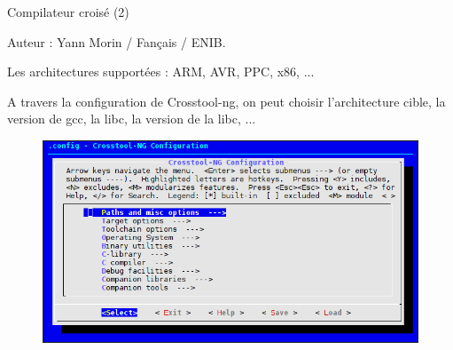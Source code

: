 \documentclass[12pt, t]{beamer}
\begin{document}
\begin{frame}{Compilateur croisé (2)}

    \vspace{10pt}
    Auteur : Yann Morin / Fançais / ENIB.

    {
        \vspace{10pt}
        Les architectures supportées : ARM, AVR, PPC, x86, ...
    }

    {
        \vspace{10pt}
        A travers la configuration de Crosstool-ng, on peut choisir
        l'architecture cible, la version de gcc, la libc, la version de la
        libc, ...
    }

    {
        \begin{figure}
            \centering
            \includegraphics[scale=0.4]{ct-ng.png}
        \end{figure}
    }
\end{frame}
\end{document}
